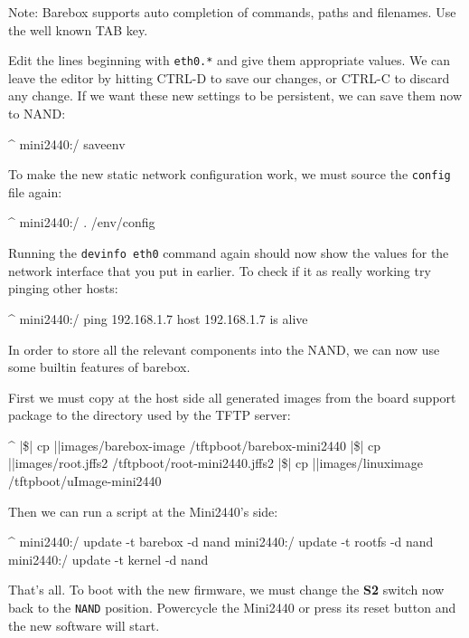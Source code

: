 Note: Barebox supports auto completion of commands, paths and filenames. Use
the well known TAB key.

Edit the lines beginning with \texttt{eth0.*} and give them appropriate values.
We can leave the editor by hitting CTRL-D to save our changes, or CTRL-C to
discard any change. If we want these new settings to be persistent, we can save
them now to NAND:

\begin{ptxshell}[escapechar=|]{^}
mini2440:/ saveenv
\end{ptxshell}

To make the new static network configuration work, we must source the
\texttt{config} file again:

\begin{ptxshell}[escapechar=|]{^}
mini2440:/ . /env/config
\end{ptxshell}

Running the \texttt{devinfo eth0} command again should now show the values for
the network interface that you put in earlier. To check if it as really working
try pinging other hosts:

\begin{ptxshell}[escapechar=|]{^}
mini2440:/ ping 192.168.1.7
host 192.168.1.7 is alive
\end{ptxshell}

In order to store all the relevant components into the NAND, we can now use
some builtin features of barebox.

First we must copy at the host side all generated images from the board support
package to the directory used by the TFTP server:

\begin{ptxshell}[escapechar=|]{^}
|\$| cp |\ptxdistPlatformDir |images/barebox-image /tftpboot/barebox-mini2440
|\$| cp |\ptxdistPlatformDir |images/root.jffs2 /tftpboot/root-mini2440.jffs2
|\$| cp |\ptxdistPlatformDir |images/linuximage /tftpboot/uImage-mini2440
\end{ptxshell}

Then we can run a script at the Mini2440's side:

\begin{ptxshell}[escapechar=|]{^}
mini2440:/ update -t barebox -d nand
mini2440:/ update -t rootfs -d nand
mini2440:/ update -t kernel -d nand
\end{ptxshell}

That's all. To boot with the new firmware, we must change the \textbf{S2} switch
now back to the \texttt{NAND} position. Powercycle the Mini2440
or press its reset button and the new software will start.

%
